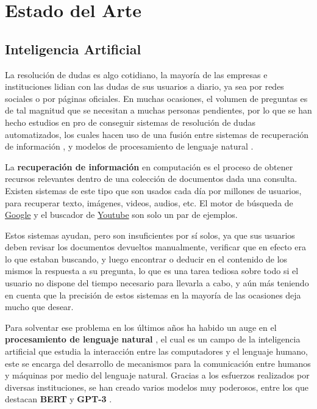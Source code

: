 \chapter{Estado del Arte}\label{chapter:state-of-the-art}

\section{Inteligencia Artificial}

La resolución de dudas es algo cotidiano, la mayoría de las empresas e instituciones lidian con las dudas de sus usuarios a diario, ya sea por redes sociales o por páginas oficiales. En muchas ocasiones, el volumen de preguntas es de tal magnitud que se necesitan a muchas personas pendientes, por lo que se han hecho estudios en pro de conseguir sistemas de resolución de dudas automatizados, los cuales hacen uso de una fusión entre sistemas de recuperación de información \cite{ir}, y modelos de procesamiento de lenguaje natural \cite{nlp}.
\newline

La \textbf{recuperación de información} \cite{ir} en computación es el proceso de obtener recursos relevantes dentro de una colección de documentos dada una consulta. Existen sistemas de este tipo que son usados cada día por millones de usuarios, para recuperar texto, imágenes, videos, audios, etc. El motor de búsqueda de \href{google.com}{Google} y el buscador de \href{youtube.com}{Youtube} son solo un par de ejemplos.
\newline

Estos sistemas ayudan, pero son insuficientes por sí solos, ya que sus usuarios deben revisar los documentos devueltos manualmente, verificar que en efecto era lo que estaban buscando, y luego encontrar o deducir en el contenido de los mismos la respuesta a su pregunta, lo que es una tarea tediosa sobre todo si el usuario no dispone del tiempo necesario para llevarla a cabo, y aún más teniendo en cuenta que la precisión de estos sistemas en la mayoría de las ocasiones deja mucho que desear.
\newline

Para solventar ese problema en los últimos años ha habido un auge en el \textbf{procesamiento de lenguaje natural} \cite{nlp}, el cual es un campo de la inteligencia artificial que estudia la interacción entre las computadores y el lenguaje humano, este se encarga del desarrollo de mecanismos para la comunicación entre humanos y máquinas por medio del lenguaje natural. Gracias a los esfuerzos realizados por diversas instituciones, se han creado varios modelos muy poderosos, entre los que destacan \textbf{BERT} \cite{bert} y \textbf{GPT-3} \cite{gpt}.
\newline


